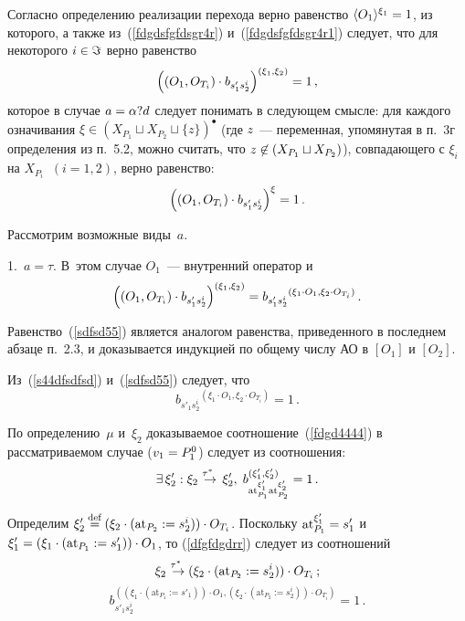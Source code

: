 \begin{multicols}{2}
Согласно определению реализации перехода
верно равенство $\langle{O_1}\rangle^{\xi_1}\hm=1$,
из которого, а также из~(\ref{fdgdsfgfdsgr4r}) и~(\ref{fdgdsfgfdsgr4r1})
следует, что для некоторого $i\hm\in \Im$ верно равенство
\begin{equation}
\label{s44dfsdfsd}
\left((O_1, O_{T_i}) \cdot b_{s'_1s^{i}_2}\right)^{(\xi_1,\xi_2)} = 1\,,
\end{equation}
которое в случае $a\hm=\alpha?d$ следует понимать в следующем
смысле: для каждого означивания
$\xi\in (X_{P_1}\sqcup X_{P_2}\sqcup \{z\})^\bullet$ (где $z$~--- переменная,
упомянутая в п.~3г определения из п.~5.2, можно считать, что
$z\hm\not\in (X_{P_1}\sqcup X_{P_2})$),
совпадающего с $\xi_i$ на $X_{P_i}\;\;(i=1,2)$, верно равенство:
$$
\left((O_1, O_{T_i}) \cdot b_{s'_1s^{i}_2}\right)^{\xi} = 1\,.
$$

Рассмотрим возможные виды~$a$.

\smallskip

1.\ $a=\tau$. В~этом случае $O_1$~--- внутренний оператор и
\begin{equation}
\label{sdfsd55}
\left ((O_1, O_{T_i}) \cdot b_{s'_1s^{i}_2}\right)^{(\xi_1,\xi_2)} =
{b_{s'_1s^{i}_2}}^{(\xi_1\cdot O_1,\xi_2\cdot O_{T_i})}\,.
\end{equation}

Равенство~(\ref{sdfsd55}) является аналогом
равенства, приведенного в последнем
абзаце п.~2.3, и доказывается индукцией по общему числу АО в $[O_1]$
и $[O_2]$.

Из~(\ref{s44dfsdfsd}) и~(\ref{sdfsd55}) следует, что
\begin{equation}
\label{sdfsd5345}
{b_{s'_1s^{i}_2}}^{(\xi_1\cdot O_1,\xi_2\cdot O_{T_i})}=1\,.
\end{equation}

По определению~$\mu$ и~$\xi_2$ доказываемое соотношение~(\ref{fdgd4444})
в рассматриваемом случае ($v_1\hm=P^0_1$) следует из соотношения:
\begin{equation}
\label{dfgfdgdrr}
\exists\,\xi'_2: \xi_2 \;\mathop{\to}\limits^{\!\!\!\tau^*}\;\xi'_2,\;
b_{\mathrm{at}_{P_1}^{\xi'_1}\mathrm{at}_{P_2}^{\xi'_2}}^{(\xi'_1,\xi'_2)}=1\,.
\end{equation}

Определим $\xi'_2\mathbin{{\mathop{=}\limits^{\mathrm{def}}}} (\xi_2\cdot (\mathrm{at}_{P_2}:=s_2^i))\cdot O_{T_i}$.
Поскольку $\mathrm{at}_{P_1}^{\xi'_1}\hm= s'_1$ и
$\xi'_1\hm=(\xi_1\cdot(\mathrm{at}_{P_1}:=s'_1))\cdot O_1$,
то (\ref{dfgfdgdrr}) следует из соотношений
\begin{equation}
\label{dfgfd2gdrr}
\xi_2 \;\mathop{\to}\limits^{\!\!\!\tau^*}\;(\xi_2\cdot (\mathrm{at}_{P_2}:=
s_2^i))\cdot O_{T_i}\,;\end{equation}
\begin{equation}
\label{dfgfd2gdr3r}
b_{s'_1s^i_2}^{((\xi_1\cdot(\mathrm{at}_{P_1}:=s'_1))\cdot O_1,(\xi_2\cdot
(\mathrm{at}_{P_2}:=s_2^i))\cdot O_{T_i})}=1\,.
\end{equation}


\end{multicols}
